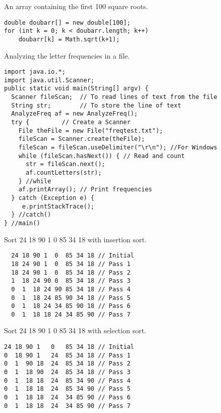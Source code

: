 \begin{ANS}
\item  An array containing the first 100 square roots.

\begin{jjjlisting}
\begin{lstlisting}
double doubarr[] = new double[100];
for (int k = 0; k < doubarr.length; k++)
    doubarr[k] = Math.sqrt(k+1);
\end{lstlisting}
\end{jjjlisting}

\item Analyzing the letter frequencies in a file.

\begin{jjjlisting}
\begin{lstlisting}
import java.io.*;
import java.util.Scanner;
public static void main(String[] argv) {
  Scanner fileScan;  // To read lines of text from the file
  String str;        // To store the line of text
  AnalyzeFreq af = new AnalyzeFreq();
  try {         // Create a Scanner
    File theFile = new File("freqtest.txt");
    fileScan = Scanner.create(theFile);
    fileScan = fileScan.useDelimiter("\r\n"); //For Windows
    while (fileScan.hasNext()) { // Read and count
      str = fileScan.next();
      af.countLetters(str);
    } //while
    af.printArray(); // Print frequencies
  } catch (Exception e) {
     e.printStackTrace();
  } //catch()
} //main()
\end{lstlisting}
\end{jjjlisting}

\item  Sort 24 18 90 1 0 85 34 18 with insertion sort.

\begin{jjjlisting}
\begin{lstlisting}
  24 18 90 1  0  85 34 18 // Initial
  18 24 90 1  0  85 34 18 // Pass 1
  18 24 90 1  0  85 34 18 // Pass 2
  1  18 24 90 0  85 34 18 // Pass 3
  0  1  18 24 90 85 34 18 // Pass 4
  0  1  18 24 85 90 34 18 // Pass 5
  0  1  18 24 34 85 90 18 // Pass 6
  0  1  18 18 24 34 85 90 // Pass 7
\end{lstlisting}
\end{jjjlisting}

\item  Sort 24 18 90 1 0 85 34 18 with selection sort.

\begin{jjjlisting}
\begin{lstlisting}
24 18 90 1   0   85 34 18 // Initial
0  18 90 1   24  85 34 18 // Pass 1
0  1  90 18  24  85 34 18 // Pass 2
0  1  18 90  24  85 34 18 // Pass 3
0  1  18 18  24  85 34 90 // Pass 4
0  1  18 18  24  85 34 90 // Pass 5
0  1  18 18  24  34 85 90 // Pass 6
0  1  18 18  24  34 85 90 // Pass 7
\end{lstlisting}
\end{jjjlisting}



\end{ANS}
